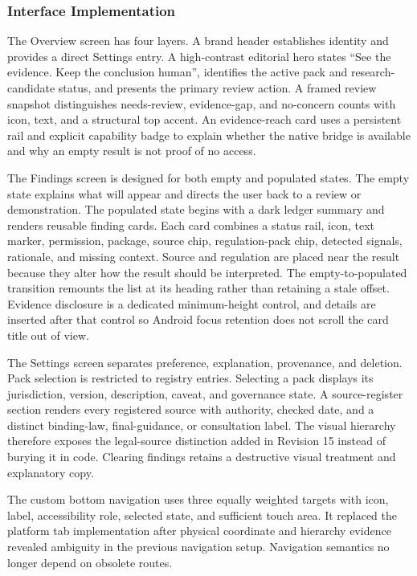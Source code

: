 \subsubsection{Interface Implementation}

The Overview screen has four layers. A brand header establishes identity and provides a direct Settings entry. A high-contrast editorial hero states ``See the evidence. Keep the conclusion human'', identifies the active pack and research-candidate status, and presents the primary review action. A framed review snapshot distinguishes needs-review, evidence-gap, and no-concern counts with icon, text, and a structural top accent. An evidence-reach card uses a persistent rail and explicit capability badge to explain whether the native bridge is available and why an empty result is not proof of no access.

The Findings screen is designed for both empty and populated states. The empty state explains what will appear and directs the user back to a review or demonstration. The populated state begins with a dark ledger summary and renders reusable finding cards. Each card combines a status rail, icon, text marker, permission, package, source chip, regulation-pack chip, detected signals, rationale, and missing context. Source and regulation are placed near the result because they alter how the result should be interpreted. The empty-to-populated transition remounts the list at its heading rather than retaining a stale offset. Evidence disclosure is a dedicated minimum-height control, and details are inserted after that control so Android focus retention does not scroll the card title out of view.

The Settings screen separates preference, explanation, provenance, and deletion. Pack selection is restricted to registry entries. Selecting a pack displays its jurisdiction, version, description, caveat, and governance state. A source-register section renders every registered source with authority, checked date, and a distinct binding-law, final-guidance, or consultation label. The visual hierarchy therefore exposes the legal-source distinction added in Revision 15 instead of burying it in code. Clearing findings retains a destructive visual treatment and explanatory copy.

The custom bottom navigation uses three equally weighted targets with icon, label, accessibility role, selected state, and sufficient touch area. It replaced the platform tab implementation after physical coordinate and hierarchy evidence revealed ambiguity in the previous navigation setup. Navigation semantics no longer depend on obsolete routes.


